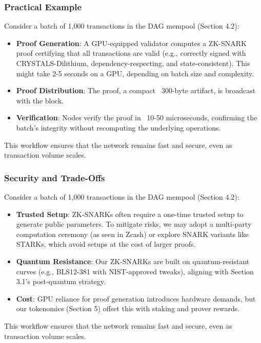 \documentclass[12pt]{article}
\begin{document}
\subsubsection{Practical Example}

\begin{justify}
    Consider a batch of 1,000 transactions in the DAG mempool (Section 4.2):

\begin{itemize}
    \item \textbf{Proof Generation}: A GPU-equipped validator computes a ZK-SNARK proof certifying that all transactions are valid (e.g., correctly signed with CRYSTALS-Dilithium, dependency-respecting, and state-consistent). This might take 2-5 seconds on a GPU, depending on batch size and complexity.

    \item \textbf{Proof Distribution}: The proof, a compact ~300-byte artifact, is broadcast with the block.
    
    \item \textbf{Verification}: Nodes verify the proof in ~10-50 microseconds, confirming the batch’s integrity without recomputing the underlying operations.

\end{itemize}

This workflow ensures that the network remains fast and secure, even as transaction volume scales.

\end{justify}


\subsubsection{Security and Trade-Offs}

\begin{justify}
    Consider a batch of 1,000 transactions in the DAG mempool (Section 4.2):

\begin{itemize}
    \item \textbf{Trusted Setup}: ZK-SNARKs often require a one-time trusted setup to generate public parameters. To mitigate risks, we may adopt a multi-party computation ceremony (as seen in Zcash) or explore SNARK variants like STARKs, which avoid setups at the cost of larger proofs.

    \item \textbf{Quantum Resistance}: Our ZK-SNARKs are built on quantum-resistant curves (e.g., BLS12-381 with NIST-approved tweaks), aligning with Section 3.1’s post-quantum strategy.
    
    \item \textbf{Cost}: GPU reliance for proof generation introduces hardware demands, but our tokenomics (Section 5) offset this with staking and prover rewards.

\end{itemize}

This workflow ensures that the network remains fast and secure, even as transaction volume scales.

\end{justify}
\end{document}
